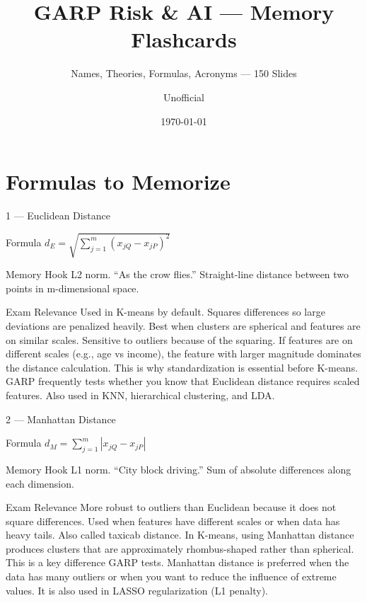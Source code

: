 \documentclass[aspectratio=169,8pt]{beamer}
\title[GARP RAI Memory]{GARP Risk \& AI --- Memory Flashcards}
\subtitle{Names, Theories, Formulas, Acronyms --- 150 Slides}
\author{Unofficial}
\date{\today}
\begin{document}
	
	\begin{frame}
		\titlepage
	\end{frame}
	
	\section{Formulas to Memorize}
	
	\begin{frame}{1 --- Euclidean Distance}
		\begin{block}{Formula}
			$d_E = \sqrt{\sum_{j=1}^{m}(x_{jQ} - x_{jP})^2}$
		\end{block}
		\begin{block}{Memory Hook}
			L2 norm. ``As the crow flies.'' Straight-line distance between two points in m-dimensional space.
		\end{block}
		\begin{block}{Exam Relevance}
			Used in K-means by default. Squares differences so large deviations are penalized heavily. Best when clusters are spherical and features are on similar scales. Sensitive to outliers because of the squaring. If features are on different scales (e.g., age vs income), the feature with larger magnitude dominates the distance calculation. This is why standardization is essential before K-means. GARP frequently tests whether you know that Euclidean distance requires scaled features. Also used in KNN, hierarchical clustering, and LDA.
		\end{block}
	\end{frame}
	
	\begin{frame}{2 --- Manhattan Distance}
		\begin{block}{Formula}
			$d_M = \sum_{j=1}^{m}|x_{jQ} - x_{jP}|$
		\end{block}
		\begin{block}{Memory Hook}
			L1 norm. ``City block driving.'' Sum of absolute differences along each dimension.
		\end{block}
		\begin{block}{Exam Relevance}
			More robust to outliers than Euclidean because it does not square differences. Used when features have different scales or when data has heavy tails. Also called taxicab distance. In K-means, using Manhattan distance produces clusters that are approximately rhombus-shaped rather than spherical. This is a key difference GARP tests. Manhattan distance is preferred when the data has many outliers or when you want to reduce the influence of extreme values. It is also used in LASSO regularization (L1 penalty).
		\end{block}
	\end{frame}
	
\end{document}

